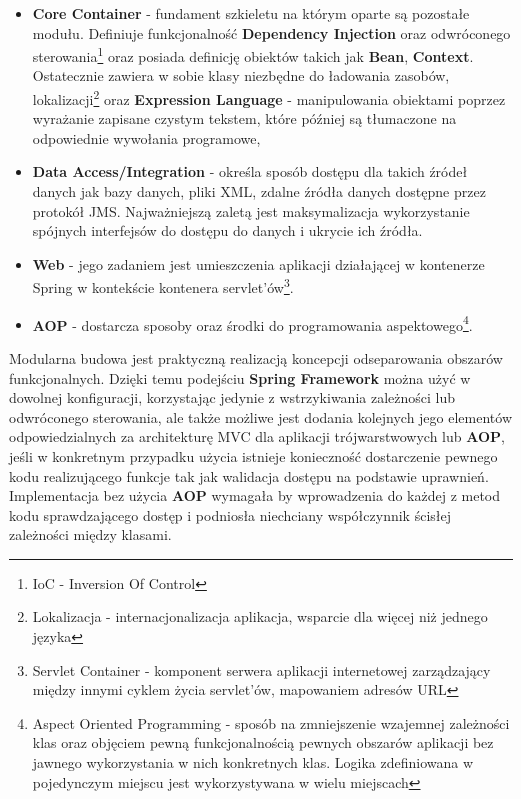 	 \begin{itemize}
	 	\item \textbf{Core Container} - fundament szkieletu na którym oparte są pozostałe modułu. Definiuje funkcjonalność \textbf{Dependency Injection} oraz odwróconego sterowania\footnote{IoC - Inversion Of Control} oraz posiada definicję obiektów takich jak \textbf{Bean}, \textbf{Context}. Ostatecznie zawiera w sobie klasy niezbędne do ładowania zasobów, lokalizacji\footnote{Lokalizacja - internacjonalizacja aplikacja, wsparcie dla więcej niż jednego języka} oraz \textbf{Expression Language} - manipulowania obiektami poprzez wyrażanie zapisane czystym tekstem, które później są tłumaczone na odpowiednie wywołania programowe,
	 	\item \textbf{Data Access/Integration} - określa sposób dostępu dla takich źródeł danych jak bazy danych, pliki XML, zdalne źródła danych dostępne przez protokół JMS. Najważniejszą zaletą jest maksymalizacja wykorzystanie spójnych interfejsów do dostępu do danych i ukrycie ich źródła.  
	 	\item \textbf{Web} - jego zadaniem jest umieszczenia aplikacji działającej w kontenerze Spring w kontekście kontenera servlet'ów\footnote{Servlet Container - komponent serwera aplikacji internetowej zarządzający między innymi cyklem życia servlet'ów, mapowaniem adresów URL}. 
	 	\item \textbf{AOP} - dostarcza sposoby oraz środki do programowania aspektowego\footnote{Aspect Oriented Programming - sposób na zmniejszenie wzajemnej zależności klas oraz objęciem pewną funkcjonalnością pewnych obszarów aplikacji bez jawnego wykorzystania w nich konkretnych klas. Logika zdefiniowana w pojedynczym miejscu jest wykorzystywana w wielu miejscach}.
	 \end{itemize}
	 Modularna budowa jest praktyczną realizacją koncepcji odseparowania obszarów funkcjonalnych. Dzięki temu podejściu \textbf{Spring Framework} można użyć w dowolnej konfiguracji, korzystając jedynie z wstrzykiwania zależności lub odwróconego sterowania, ale także możliwe jest dodania kolejnych jego elementów odpowiedzialnych za architekturę MVC dla aplikacji trójwarstwowych lub \textbf{AOP}, jeśli w konkretnym przypadku użycia istnieje konieczność dostarczenie pewnego kodu realizującego funkcje tak jak walidacja dostępu na podstawie uprawnień. Implementacja bez użycia \textbf{AOP} wymagała by wprowadzenia do każdej z metod kodu sprawdzającego dostęp i podniosła niechciany współczynnik ścisłej zależności między klasami. 
		
